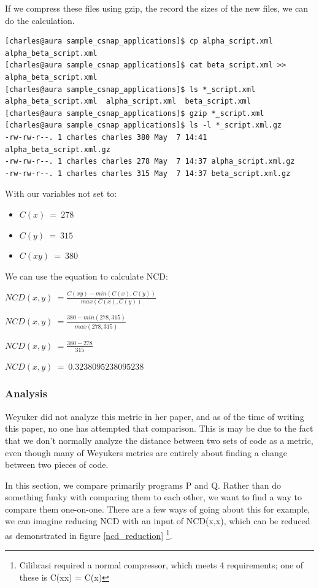 \documentclass[]{article}
\begin{document}
If we compress these files using gzip, the record the sizes of the new files, we can do the calculation.

\begin{lstlisting}
[charles@aura sample_csnap_applications]$ cp alpha_script.xml alpha_beta_script.xml
[charles@aura sample_csnap_applications]$ cat beta_script.xml >> alpha_beta_script.xml
[charles@aura sample_csnap_applications]$ ls *_script.xml
alpha_beta_script.xml  alpha_script.xml  beta_script.xml
[charles@aura sample_csnap_applications]$ gzip *_script.xml
[charles@aura sample_csnap_applications]$ ls -l *_script.xml.gz
-rw-rw-r--. 1 charles charles 380 May  7 14:41 alpha_beta_script.xml.gz
-rw-rw-r--. 1 charles charles 278 May  7 14:37 alpha_script.xml.gz
-rw-rw-r--. 1 charles charles 315 May  7 14:37 beta_script.xml.gz

\end{lstlisting}

With our variables not set to:

\begin{itemize}
	\item $C(x) ~= ~278$
	\item $C(y) ~= ~315$
	\item $C(xy) ~= ~380$
\end{itemize}

We can use the equation to calculate NCD:

$NCD(x,y) ~= \frac{C(xy) - min(C(x),C(y))}{max(C(x),C(y))}$

$NCD(x,y) ~= \frac{380 - min(278,315)}{max(278,315)}$

$NCD(x,y) ~= \frac{380 - 278}{315}$

$NCD(x,y) ~= ~0.3238095238095238$

\subsubsection{Analysis}

Weyuker did not analyze this metric in her paper, and as of the time of writing this paper, no one has attempted that comparison.
This is may be due to the fact that we don't normally analyze the distance between two sets of code as a metric, even though many of Weyukers metrics are entirely about finding a change between two pieces of code.

In this section, we compare primarily programs P and Q.
Rather than do something funky with comparing them to each other, we want to find a way to compare them one-on-one.
There are a few ways of going about this for example, we can imagine reducing NCD with an input of NCD(x,x), which can be reduced as demonstrated in figure \ref{ncd_reduction} \footnote{Cilibrasi required a normal compressor, which meets 4 requirements; one of these is C(xx) = C(x)}.
\end{document}

